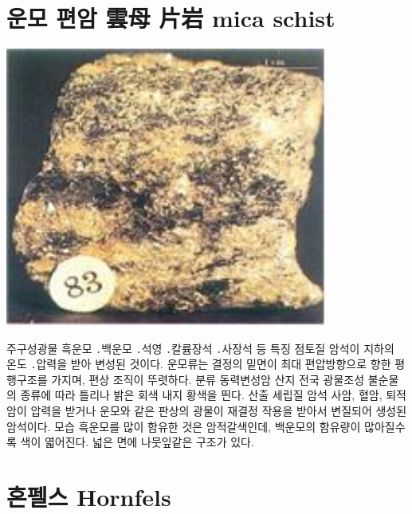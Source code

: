 \documentclass[12pt, a4paper, twoside]{book}
\begin{document}
	\clearpage
	\section{	운모 편암 雲母 片岩 mica schist }	



				\begin{center}
				\includegraphics[width=0.8\textwidth]{./fig/mica_schist_0001.jpg}
				\end{center}





주구성광물
흑운모 ․백운모 ․석영 ․칼륨장석 ․사장석 등
특징
점토질 암석이 지하의 온도 ․압력을 받아 변성된 것이다. 운모류는 결정의 밑면이 최대 편압방향으로 향한 평행구조를 가지며, 편상 조직이 뚜렷하다. 
분류
동력변성암
산지
전국
광물조성
불순물의 종류에 따라 틀리나 밝은 회색 내지 황색을 띈다.
산출
세립질 암석 사암, 혈암, 퇴적암이 압력을 받거나 운모와 같은 판상의 광물이 재결정 작용을 받아서 변질되어 생성된 암석이다.
모습
흑운모를 많이 함유한 것은 암적갈색인데, 백운모의 함유량이 많아질수록 색이 엷어진다. 넓은 면에 나뭇잎같은 구조가 있다.




	\clearpage
	\section{	혼펠스 Hornfels }
	
\end{document}
